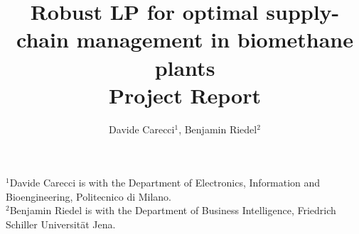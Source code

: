 \documentclass[a4paper, 10pt, conference]{ieeeconf}      %
\title{\LARGE \bf
Robust LP for optimal supply-chain management in biomethane plants \\

Project Report
}
\author{Davide Carecci$^1$, Benjamin Riedel$^2$}
\begin{document}
\maketitle
\thispagestyle{empty}
\pagestyle{empty}

$^1$Davide Carecci is with the Department of Electronics, Information and Bioengineering, Politecnico di Milano. \\
$^2$Benjamin Riedel is with the Department of Business Intelligence, Friedrich Schiller Universität Jena.\\






\end{document}
